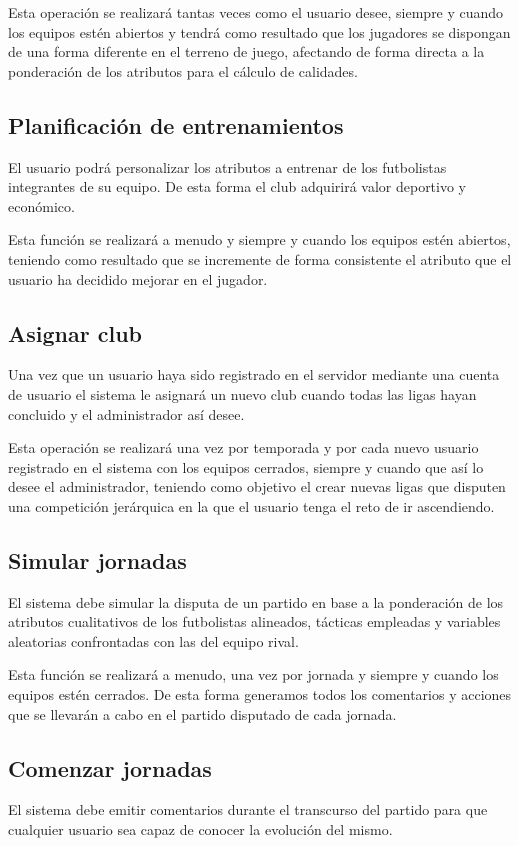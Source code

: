 Esta operación se realizará tantas veces como el usuario desee, siempre y cuando
los equipos estén abiertos y tendrá como
resultado que los jugadores se dispongan de una forma diferente en el terreno de
juego, afectando de forma directa a la ponderación de los atributos para el
cálculo de calidades.
\subsection*{Planificación de entrenamientos}
El usuario podrá personalizar los atributos a entrenar de los futbolistas
integrantes de su equipo. De esta forma el club adquirirá valor deportivo y
económico.

Esta función se realizará a menudo y siempre y cuando los equipos estén
abiertos, teniendo como resultado que se incremente de forma consistente el
atributo que el usuario ha decidido mejorar en el jugador.

\subsection*{Asignar club}
Una vez que un usuario haya sido registrado en el servidor mediante una cuenta
de usuario el sistema le asignará un nuevo club cuando todas las ligas hayan
concluido y el administrador así desee.

Esta operación se realizará una vez por temporada y por cada nuevo usuario
registrado en el sistema con los equipos cerrados, siempre y cuando que así lo desee el administrador,
teniendo como objetivo el crear nuevas ligas que disputen una competición
jerárquica en la que el usuario tenga el reto de ir ascendiendo.

\subsection*{Simular jornadas}
El sistema debe simular la disputa de un partido en base a la ponderación de los
atributos cualitativos de los futbolistas alineados, tácticas empleadas y
variables aleatorias confrontadas con las del equipo rival.

Esta función se realizará a menudo, una vez por jornada y siempre y cuando los
equipos estén cerrados. De esta forma generamos todos los comentarios y acciones
que se llevarán a cabo en el partido disputado de cada jornada.

\subsection*{Comenzar jornadas}
El sistema debe emitir comentarios durante el transcurso del partido para que
cualquier usuario sea capaz de conocer la evolución del mismo.

